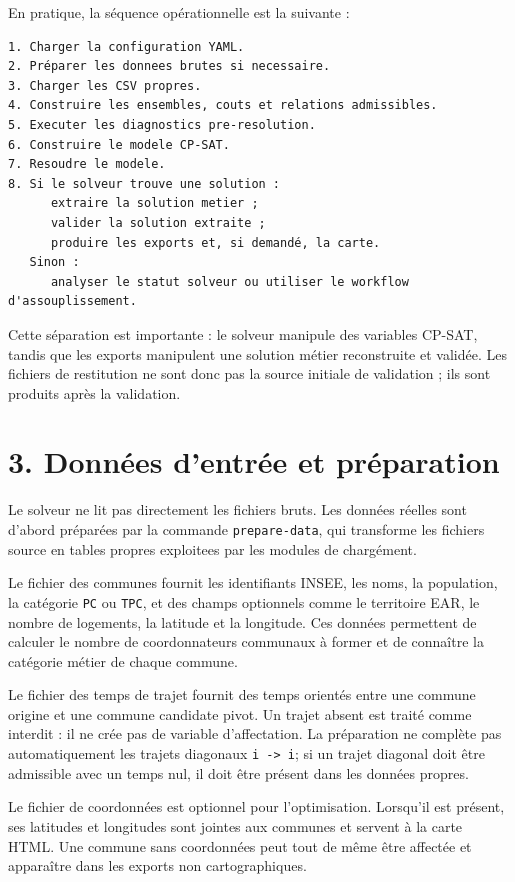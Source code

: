 \documentclass[11pt,a4paper]{article}
\begin{document}
En pratique, la séquence opérationnelle est la suivante :

\begin{verbatim}
1. Charger la configuration YAML.
2. Préparer les donnees brutes si necessaire.
3. Charger les CSV propres.
4. Construire les ensembles, couts et relations admissibles.
5. Executer les diagnostics pre-resolution.
6. Construire le modele CP-SAT.
7. Resoudre le modele.
8. Si le solveur trouve une solution :
      extraire la solution metier ;
      valider la solution extraite ;
      produire les exports et, si demandé, la carte.
   Sinon :
      analyser le statut solveur ou utiliser le workflow d'assouplissement.
\end{verbatim}

Cette séparation est importante : le solveur manipule des variables CP-SAT, tandis que les exports manipulent une solution métier reconstruite et validée. Les fichiers de restitution ne sont donc pas la source initiale de validation ; ils sont produits après la validation.

\section{3. Données d'entrée et préparation}

Le solveur ne lit pas directement les fichiers bruts. Les données réelles sont d'abord préparées par la commande \texttt{prepare-data}, qui transforme les fichiers source en tables propres exploitees par les modules de chargément.

Le fichier des communes fournit les identifiants INSEE, les noms, la population, la catégorie \texttt{PC} ou \texttt{TPC}, et des champs optionnels comme le territoire EAR, le nombre de logements, la latitude et la longitude. Ces données permettent de calculer le nombre de coordonnateurs communaux à former et de connaître la catégorie métier de chaque commune.

Le fichier des temps de trajet fournit des temps orientés entre une commune origine et une commune candidate pivot. Un trajet absent est traité comme interdit : il ne crée pas de variable d'affectation. La préparation ne complète pas automatiquement les trajets diagonaux \texttt{i -> i}; si un trajet diagonal doit être admissible avec un temps nul, il doit être présent dans les données propres.

Le fichier de coordonnées est optionnel pour l'optimisation. Lorsqu'il est présent, ses latitudes et longitudes sont jointes aux communes et servent à la carte HTML. Une commune sans coordonnées peut tout de même être affectée et apparaître dans les exports non cartographiques.
\end{document}
